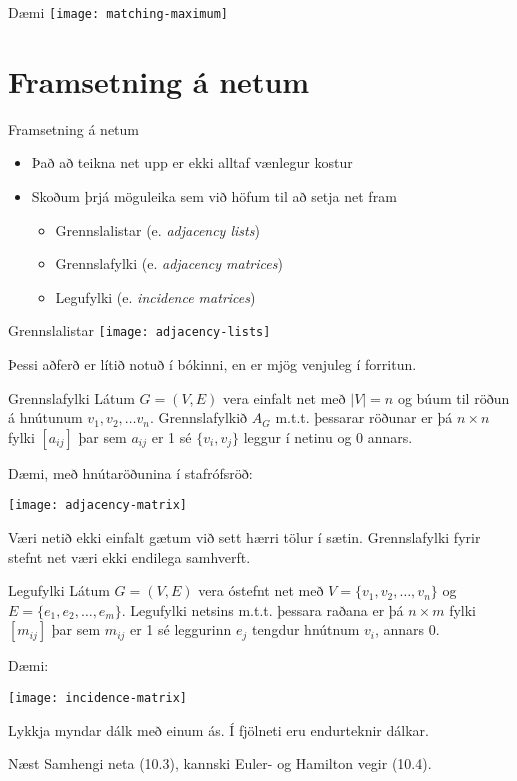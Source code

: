 \documentclass{beamer}
\begin{document}
\begin{frame}{Dæmi}
\texttt{[image: matching-maximum]}
\end{frame}

\section{Framsetning á netum}

\begin{frame}{Framsetning á netum}
\begin{itemize}
 \item Það að teikna net upp er ekki alltaf vænlegur kostur
 \item Skoðum þrjá möguleika sem við höfum til að setja net fram
 \begin{itemize}
  \item Grennslalistar (e. \emph{adjacency lists})
  \item Grennslafylki (e. \emph{adjacency matrices})
  \item Legufylki (e. \emph{incidence matrices})
 \end{itemize}
\end{itemize}
\end{frame}

\begin{frame}{Grennslalistar}
\texttt{[image: adjacency-lists]}

Þessi aðferð er lítið notuð í bókinni, en er mjög venjuleg í forritun.
\end{frame}

\begin{frame}{Grennslafylki}
Látum $G = (V, E)$ vera einfalt net með $|V| = n$ og búum til röðun á hnútunum $v_1, v_2, \ldots v_n$. Grennslafylkið $A_G$ m.t.t. þessarar röðunar er þá $n \times n$ fylki $[a_{ij}]$ þar sem $a_{ij}$ er 1 sé $\{v_i,v_j\}$ leggur í netinu og 0 annars.

Dæmi, með hnútaröðunina í stafrófsröð:
\begin{center}
\texttt{[image: adjacency-matrix]}
\end{center}
Væri netið ekki einfalt gætum við sett hærri tölur í sætin. Grennslafylki fyrir stefnt net væri ekki endilega samhverft.
\end{frame}

\begin{frame}{Legufylki}
Látum $G = (V, E)$ vera óstefnt net með $V = \{v_1, v_2, \ldots, v_n\}$ og $E = \{e_1, e_2, \ldots, e_m\}$. Legufylki netsins m.t.t. þessara raðana er þá $n \times m$ fylki $[m_{ij}]$ þar sem $m_{ij}$ er 1 sé leggurinn $e_j$ tengdur hnútnum $v_i$, annars 0.

Dæmi:
\begin{center}
\texttt{[image: incidence-matrix]}
\end{center}
Lykkja myndar dálk með einum ás. Í fjölneti eru endurteknir dálkar.
\end{frame}

\begin{frame}{Næst}
Samhengi neta (10.3), kannski Euler- og Hamilton vegir (10.4).
\end{frame}
\end{document}
